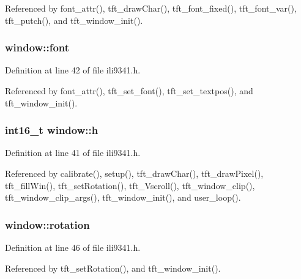 Referenced by font\+\_\+attr(), tft\+\_\+draw\+Char(), tft\+\_\+font\+\_\+fixed(), tft\+\_\+font\+\_\+var(), tft\+\_\+putch(), and tft\+\_\+window\+\_\+init().

\subsubsection[{\texorpdfstring{font}{font}}]{ window\+::font}\hypertarget{structwindow_acee24e56db43557a46cbb5ca3fe35021}{}\label{structwindow_acee24e56db43557a46cbb5ca3fe35021}


Definition at line 42 of file ili9341.\+h.



Referenced by font\+\_\+attr(), tft\+\_\+set\+\_\+font(), tft\+\_\+set\+\_\+textpos(), and tft\+\_\+window\+\_\+init().

\subsubsection[{\texorpdfstring{h}{h}}]{\setlength{\rightskip}{0pt plus 5cm}int16\+\_\+t window\+::h}\hypertarget{structwindow_a822391abd5d09e6ce7152f68cff3ef2b}{}\label{structwindow_a822391abd5d09e6ce7152f68cff3ef2b}


Definition at line 41 of file ili9341.\+h.



Referenced by calibrate(), setup(), tft\+\_\+draw\+Char(), tft\+\_\+draw\+Pixel(), tft\+\_\+fill\+Win(), tft\+\_\+set\+Rotation(), tft\+\_\+\+Vscroll(), tft\+\_\+window\+\_\+clip(), tft\+\_\+window\+\_\+clip\+\_\+args(), tft\+\_\+window\+\_\+init(), and user\+\_\+loop().

\subsubsection[{\texorpdfstring{rotation}{rotation}}]{ window\+::rotation}\hypertarget{structwindow_afbd48ebcb41e68d0f458dac593578aa8}{}\label{structwindow_afbd48ebcb41e68d0f458dac593578aa8}


Definition at line 46 of file ili9341.\+h.



Referenced by tft\+\_\+set\+Rotation(), and tft\+\_\+window\+\_\+init().

